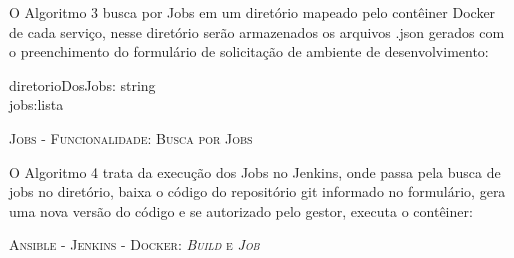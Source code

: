     \vspace*{2cm}
O Algoritmo 3 busca por Jobs em um diretório mapeado pelo contêiner Docker de cada serviço, nesse diretório serão armazenados os arquivos .json gerados com o preenchimento do formulário de solicitação de ambiente de desenvolvimento:	

\begin{algorithm}[H]
	\SetAlgoLined
	
		diretorioDosJobs: string\\
		jobs:lista
	
	\label{alg:algoritmo03}
	\caption{\textsc{Jobs - Funcionalidade: Busca por Jobs}}
\end{algorithm}

    
O Algoritmo 4 trata da execução dos Jobs no Jenkins, onde passa pela busca de jobs no diretório, baixa o código do repositório git informado no formulário, gera uma nova versão do código e se autorizado pelo gestor, executa o contêiner:	

\begin{algorithm}[H]
	\SetAlgoLined
	

	\label{alg:algoritmo04}
	\caption{\textsc{Ansible - Jenkins - Docker: \textit{Build} e \textit{Job}}}
\end{algorithm}



